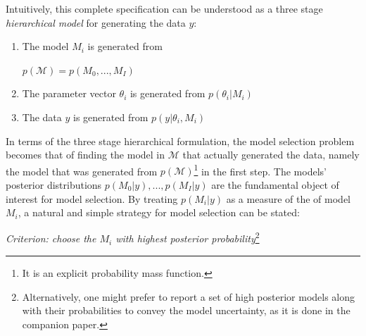 \documentclass[11 pt]{article}
\begin{document}
\begin{multicols}{2}
Intuitively, this complete specification can be understood as a three stage \textit{hierarchical model} for generating the data $y$: 
\begin{enumerate}
    \item The model $M_i$ is generated from\\ \centerline{$p(\mathcal{M}) = p(M_0,...,M_I)$}
    \item The parameter vector $\theta_i$ is generated from $p(\theta_i|M_i)$
    \item The data $y$ is generated from $p(y| \theta_i, M_i)$
\end{enumerate}
In terms of the three stage hierarchical formulation, the model selection problem becomes that of finding the model in $\mathcal{M}$ that actually generated the data, namely the model that was generated from $p(\mathcal{M})$\footnote{It is an explicit probability mass function.} in the first step.
The models' posterior distributions $p(M_0|y), ..., p(M_I|y)$ are the fundamental object of
interest for model selection. By treating $p(M_i| y)$ as a measure of the  of model $M_i$, a natural and simple strategy for model selection can be stated:
\begin{displayquote}
\centering
\textit{Criterion: choose the $M_i$ with highest posterior probability}\footnote{Alternatively, one might prefer to report a set of high posterior models along with their probabilities to convey the model uncertainty, as it is done in the companion paper.}
\end{displayquote}


\end{multicols}
\end{document}
